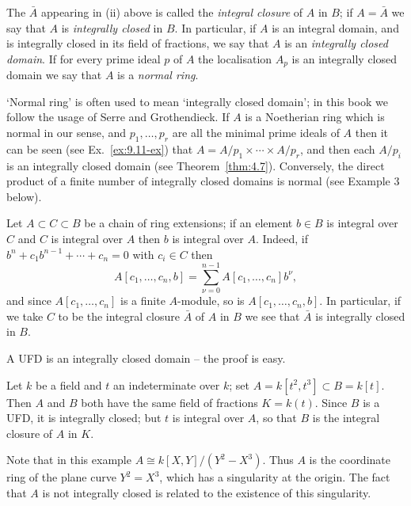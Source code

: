 The $\bar{A}$ appearing in (ii) above is called the \emph{integral closure} of $A$ in $B$; if
$A = \bar{A}$ we say that $A$ is \emph{integrally closed} in $B$. In particular, if $A$ is an integral
domain, and is integrally closed in its field of fractions, we say that $A$ is an
\emph{integrally closed domain}. If for every prime ideal $p$ of $A$ the localisation $A_p$ is
an integrally closed domain we say that $A$ is a \emph{normal ring}.

\begin{remark}
`Normal ring' is often used to mean `integrally closed domain'; in
this book we follow the usage of Serre and Grothendieck. If $A$ is a
Noetherian ring which is normal in our sense, and $p_1, \ldots, p_r$ are all
the minimal prime ideals of $A$ then it can be seen (see Ex.~\ref{ex:9.11-ex}) that
$A = A/p_1 \times \cdots \times A/p_r$, and then each $A/p_i$ is an integrally closed domain
(see Theorem~\ref{thm:4.7}). Conversely, the direct product of a finite number of
integrally closed domains is normal (see Example 3 below).
\end{remark}

Let $A \subset C \subset B$ be a chain of ring extensions; if an element $b \in B$ is integral
over $C$ and $C$ is integral over $A$ then $b$ is integral over $A$. Indeed, if
$b^n + c_1b^{n-1} + \cdots + c_n = 0$ with $c_i \in C$ then
\[
  A[c_1, \ldots, c_n, b] = \sum_{\nu=0}^{n-1} A[c_1, \ldots, c_n]b^\nu,
\]
and since $A[c_1, \ldots, c_n]$ is a finite $A$-module, so is $A[c_1, \ldots, c_n, b]$. In
particular, if we take $C$ to be the integral closure $\bar{A}$ of $A$ in $B$ we see that
$\bar{A}$ is integrally closed in $B$.

\begin{example}\label{ex:9.1}
A UFD is an integrally closed domain -- the proof is easy.
\end{example}

\begin{example}\label{ex:9.2}
Let $k$ be a field and $t$ an indeterminate over $k$; set $A =
k[t^2, t^3] \subset B = k[t]$. Then $A$ and $B$ both have the same field of fractions
$K = k(t)$. Since $B$ is a UFD, it is integrally closed; but $t$ is integral over
$A$, so that $B$ is the integral closure of $A$ in $K$.

Note that in this example $A \cong k[X, Y]/(Y^2 - X^3)$. Thus $A$ is the
coordinate ring of the plane curve $Y^2 = X^3$, which has a singularity at the
origin. The fact that $A$ is not integrally closed is related to the existence of
this singularity.
\end{example}

